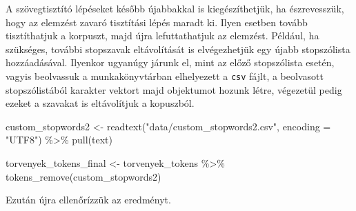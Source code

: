 \documentclass[
]{book}
\newenvironment{Shaded}{\begin{snugshade}}{\end{snugshade}}
\newcommand{\AttributeTok}[1]{\textcolor[rgb]{0.77,0.63,0.00}{#1}}
\newcommand{\FunctionTok}[1]{\textcolor[rgb]{0.00,0.00,0.00}{#1}}
\newcommand{\NormalTok}[1]{#1}
\newcommand{\OtherTok}[1]{\textcolor[rgb]{0.56,0.35,0.01}{#1}}
\newcommand{\SpecialCharTok}[1]{\textcolor[rgb]{0.00,0.00,0.00}{#1}}
\newcommand{\StringTok}[1]{\textcolor[rgb]{0.31,0.60,0.02}{#1}}
\begin{document}
A szövegtisztító lépéseket később újabbakkal is kiegészíthetjük, ha
észrevesszük, hogy az elemzést zavaró tisztítási lépés maradt ki. Ilyen
esetben tovább tisztíthatjuk a korpuszt, majd újra lefuttathatjuk az
elemzést. Például, ha szükséges, további stopszavak eltávolítását is
elvégezhetjük egy újabb stopszólista hozzáadásával. Ilyenkor ugyanúgy
járunk el, mint az előző stopszólista esetén, vagyis beolvassuk a
munkakönyvtárban elhelyezett a \texttt{csv} fájlt, a beolvasott
stopszólistából karakter vektort majd objektumot hozunk létre, végezetül
pedig ezeket a szavakat is eltávolítjuk a kopuszból.

\begin{Shaded}
\begin{Highlighting}[]
\NormalTok{custom\_stopwords2 }\OtherTok{\textless{}{-}} \FunctionTok{readtext}\NormalTok{(}\StringTok{"data/custom\_stopwords2.csv"}\NormalTok{, }\AttributeTok{encoding =} \StringTok{"UTF8"}\NormalTok{) }\SpecialCharTok{\%\textgreater{}\%}
  \FunctionTok{pull}\NormalTok{(text)}

\NormalTok{torvenyek\_tokens\_final }\OtherTok{\textless{}{-}}\NormalTok{ torvenyek\_tokens }\SpecialCharTok{\%\textgreater{}\%}
  \FunctionTok{tokens\_remove}\NormalTok{(custom\_stopwords2)}
\end{Highlighting}
\end{Shaded}

Ezután újra ellenőrízzük az eredményt.
\end{document}
